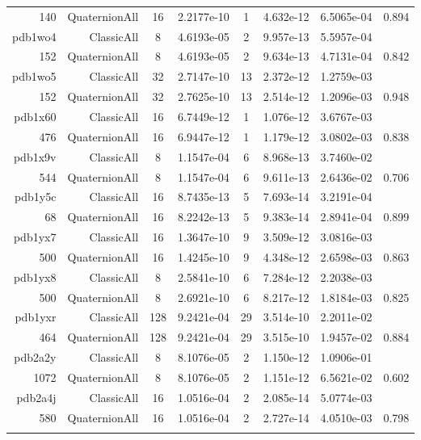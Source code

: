 \begin{xltabular}{\textwidth}{r|rcS[table-format=1.4e+2]cS[table-format=1.3e+2]S[table-format=1.4e+2]S[table-format=-1.3]}
140 & QuaternionAll & 16 & 2.2177e-10 & 1 & 4.632e-12 & 6.5065e-04 & 0.894\\  \addlinespace
pdb1wo4 & ClassicAll & 8 & 4.6193e-05 & 2 & 9.957e-13 & 5.5957e-04 & \\
152 & QuaternionAll & 8 & 4.6193e-05 & 2 & 9.634e-13 & 4.7131e-04 & 0.842\\  \addlinespace
pdb1wo5 & ClassicAll & 32 & 2.7147e-10 & 13 & 2.372e-12 & 1.2759e-03 & \\
152 & QuaternionAll & 32 & 2.7625e-10 & 13 & 2.514e-12 & 1.2096e-03 & 0.948\\  \addlinespace
pdb1x60 & ClassicAll & 16 & 6.7449e-12 & 1 & 1.076e-12 & 3.6767e-03 & \\
476 & QuaternionAll & 16 & 6.9447e-12 & 1 & 1.179e-12 & 3.0802e-03 & 0.838\\  \addlinespace
pdb1x9v & ClassicAll & 8 & 1.1547e-04 & 6 & 8.968e-13 & 3.7460e-02 & \\
544 & QuaternionAll & 8 & 1.1547e-04 & 6 & 9.611e-13 & 2.6436e-02 & 0.706\\  \addlinespace
pdb1y5c & ClassicAll & 16 & 8.7435e-13 & 5 & 7.693e-14 & 3.2191e-04 & \\
68 & QuaternionAll & 16 & 8.2242e-13 & 5 & 9.383e-14 & 2.8941e-04 & 0.899\\  \addlinespace
pdb1yx7 & ClassicAll & 16 & 1.3647e-10 & 9 & 3.509e-12 & 3.0816e-03 & \\
500 & QuaternionAll & 16 & 1.4245e-10 & 9 & 4.348e-12 & 2.6598e-03 & 0.863\\  \addlinespace
pdb1yx8 & ClassicAll & 8 & 2.5841e-10 & 6 & 7.284e-12 & 2.2038e-03 & \\
500 & QuaternionAll & 8 & 2.6921e-10 & 6 & 8.217e-12 & 1.8184e-03 & 0.825\\  \addlinespace
pdb1yxr & ClassicAll & 128 & 9.2421e-04 & 29 & 3.514e-10 & 2.2011e-02 & \\
464 & QuaternionAll & 128 & 9.2421e-04 & 29 & 3.515e-10 & 1.9457e-02 & 0.884\\  \addlinespace
pdb2a2y & ClassicAll & 8 & 8.1076e-05 & 2 & 1.150e-12 & 1.0906e-01 & \\
1072 & QuaternionAll & 8 & 8.1076e-05 & 2 & 1.151e-12 & 6.5621e-02 & 0.602\\  \addlinespace
pdb2a4j & ClassicAll & 16 & 1.0516e-04 & 2 & 2.085e-14 & 5.0774e-03 & \\
580 & QuaternionAll & 16 & 1.0516e-04 & 2 & 2.727e-14 & 4.0510e-03 & 0.798\\  \addlinespace

\end{xltabular}
